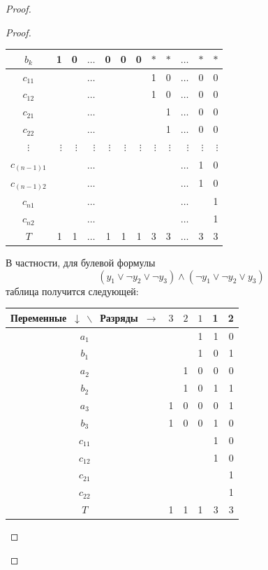 \documentclass[a4paper,12pt]{article}
\begin{document}
\begin{proof}
\begin{proof}
\begin{center}
\begin{tabular}{||c||*{6}{r|}|*{5}{r|}|}
        \hline
        $b_k$ &1 &0 &$\ldots$ & 0& 0&0 &$\ast$ &$\ast$ &$\ldots$ & $\ast$ & $\ast$\\
        \hline
        \hline
        $c_{11}$ & & &$\ldots$ & & & &1 &0 &$\ldots$ & 0 & 0\\
        \hline
        $c_{12}$ & & &$\ldots$ & & & &1 &0 &$\ldots$ & 0 & 0\\
        \hline
        $c_{21}$ & & &$\ldots$ & & & & &1 &$\ldots$ & 0 & 0\\
        \hline
        $c_{22}$ & & &$\ldots$ & & & & &1 &$\ldots$ & 0 & 0\\
        \hline 
        $\vdots$ & $\vdots$ &$\vdots$ &$\vdots$ &$\vdots$ &$\vdots$ &$\vdots$ &$\vdots$ &$\vdots$ &$\vdots$ &$\vdots$ &$\vdots$ \\
        \hline
        $c_{(n - 1)1}$ & & &$\ldots$ & & & & &&$\ldots$& 1 & 0\\
        \hline
        $c_{(n - 1)2}$ & & &$\ldots$ & & & & & &$\ldots$& 1 & 0\\
        \hline
        $c_{n1}$ & & &$\ldots$ & & & & &&$\ldots$&  & 1\\
        \hline
        $c_{n2}$ & & &$\ldots$ & & & & & &$\ldots$&  & 1\\
        \hline
        \hline
        $T$ &1 & 1&$\ldots$ & 1& 1&1 &3 &3 &$\ldots$ & 3 & 3\\
        \hline
        \hline
        \end{tabular}
        \end{center}
        В частности, для булевой формулы \[(y_1\vee \neg y_2 \vee \neg y_3) \wedge (\neg y_1 \vee \neg y_2 \vee y_3)\] таблица получится следующей:
        \begin{center}
        \begin{tabular}{||c||*{3}{r|}|*{2}{r|}|}
        \hline
        \hline
        Переменные\ $\downarrow\ \backslash$\ Разряды\ $\rightarrow$& $3$ & $2$ & $1$ & 1 & 2 \\
        \hline
        \hline
        $a_1$ & & & 1& 1& 0\\
        \hline
        $b_1$ & & & 1& 0&1 \\
        \hline
        $a_2$ & & 1& 0& 0&0 \\
        \hline
        $b_2$ & & 1& 0& 1& 1\\
        \hline
        $a_3$ & 1& 0& 0& 0&1 \\
        \hline
        $b_3$ & 1& 0& 0& 1& 0\\
        \hline
        \hline 
        $c_{11}$ & & & & 1& 0\\
        \hline
        $c_{12}$ & & & & 1& 0\\
        \hline
        $c_{21}$ & & & & & 1\\
        \hline
        $c_{22}$ & & & & & 1\\
        \hline
        \hline
        $T$ & 1& 1& 1& 3& 3\\
        \hline
        \hline
        \end{tabular}\end{center}
        

\end{proof}
\end{proof}
\end{document}
